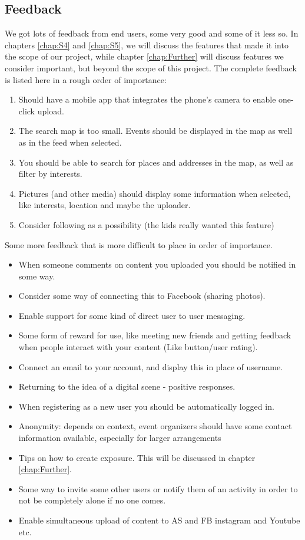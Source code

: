 \subsection{Feedback}
\label{subsec:S2PresentationFeedback}

We got lots of feedback from end users, some very good and some of it less so.  In chapters \ref{chap:S4} and \ref{chap:S5}, we will discuss the features that made it into the scope of our project, while chapter \ref{chap:Further} will discuss features we consider important, but beyond the scope of this project. The complete feedback is listed here in a rough order of importance:

\begin{enumerate}
  \item Should have a mobile app that integrates the phone's camera to enable one-click upload.
  \item The search map is too small. Events should be displayed in the map as well as in the feed when selected.
  \item You should be able to search for places and addresses in the map, as well as filter by interests.
  \item Pictures (and other media) should display some information when selected, like interests, location and maybe the uploader.
  \item Consider following as a possibility (the kids really wanted this feature) 
\end{enumerate}

Some more feedback that is more difficult to place in order of importance.

\begin{itemize}
  \item When someone comments on content you uploaded you should be notified in some way.
  \item Consider some way of connecting this to Facebook (sharing photos).
  \item Enable support for some kind of direct user to user messaging.
  \item Some form of reward for use, like meeting new friends and getting feedback when people interact with your content (Like button/user rating).
  \item Connect an email to your account, and display this in place of username.
  \item Returning to the idea of a digital scene - positive responses.
  \item When registering as a new user you should be automatically logged in.
  \item Anonymity: depends on context, event organizers should have some contact information available, especially for larger arrangements
  \item Tips on how to create exposure. This will be discussed in chapter \ref{chap:Further}.
  \item Some way to invite some other users or notify them of an activity in order to not be completely alone if no one comes.
  \item Enable simultaneous upload of content to AS and FB instagram and Youtube etc.
\end{itemize}


